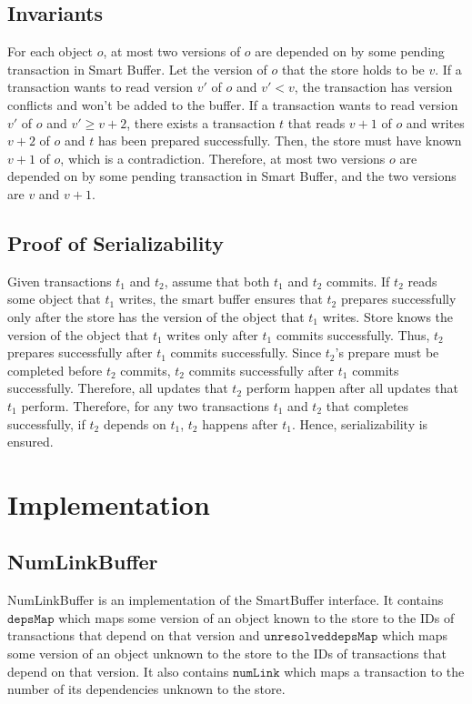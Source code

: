 \documentclass{article}
\begin{document}
\subsection{Invariants}
\label{sec:inv}
For each object $o$, at most two versions of $o$ are depended on by some pending
transaction in Smart Buffer. Let the version of $o$ that the store holds to be $v$. 
If a transaction wants to read version $v'$ of $o$ and $v' < v$, the transaction 
has version conflicts and won't be added to the buffer. If a transaction wants to
read version $v'$ of $o$ and $v' \geq v + 2$, there exists a transaction $t$ that 
reads $v + 1$ of $o$ and writes $v + 2$ of $o$ and $t$ has been prepared successfully.
Then, the store must have known $v + 1$ of $o$, which is a contradiction. Therefore,
at most two versions $o$ are depended on by some pending transaction in Smart Buffer,
and the two versions are $v$ and $v + 1$.

\subsection{Proof of Serializability}
Given transactions $t_1$ and $t_2$, assume that both $t_1$ and $t_2$ commits. If $t_2$
reads some object that $t_1$ writes, the smart buffer ensures that $t_2$ prepares 
successfully only after the store has the version of the object that $t_1$ writes. 
Store knows the version of the object that $t_1$ writes only after $t_1$ commits successfully.
Thus, $t_2$ prepares successfully after $t_1$ commits successfully. Since $t_2$'s prepare
must be completed before $t_2$ commits, $t_2$ commits successfully after $t_1$ commits
successfully. Therefore, all updates that $t_2$ perform happen after all updates that $t_1$ perform.
Therefore, for any two transactions $t_1$ and $t_2$ that completes successfully, if $t_2$
depends on $t_1$, $t_2$ happens after $t_1$. Hence, serializability is ensured.

\section{Implementation}
\label{sec:implementation}
\subsection{NumLinkBuffer}
NumLinkBuffer is an implementation of the SmartBuffer interface. It contains
$\mathtt{depsMap}$ which maps some version of an object known to the store 
to the IDs of transactions that depend on that version and $\mathtt{unresolveddepsMap}$ 
which maps some version of an object unknown to the store to the IDs of
transactions that depend on that version. It also contains $\mathtt{numLink}$
which maps a transaction to the number of its dependencies unknown to the store. 
\end{document}
